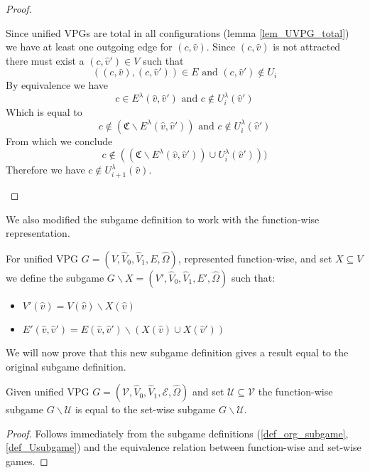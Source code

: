 \begin{lemma}
\begin{proof}
\begin{itemize}
			Since unified VPGs are total in all configurations (lemma \ref{lem_UVPG_total}) we have at least one outgoing edge for $(c,\hat{v})$. Since $(c,\hat{v})$ is not attracted there must exist a $(c,\hat{v}') \in V$ such that 
			\[ ((c,\hat{v}),(c,\hat{v}')) \in E  \text{ and } (c,\hat{v}') \notin U_i \]
			By equivalence we have 
			\[ c \in E^\lambda(\hat{v},\hat{v}')  \text{ and } c \notin U^\lambda_i(\hat{v}') \]
			Which is equal to
			\[ c \notin (\mathfrak{C} \backslash E^\lambda(\hat{v},\hat{v}'))  \text{ and } c \notin U^\lambda_i(\hat{v}') \]
			From which we conclude
			\[ c \notin ((\mathfrak{C} \backslash E^\lambda(\hat{v},\hat{v}')) \cup U^\lambda_i(\hat{v}'))) \]
			Therefore we have $c \notin U^\lambda_{i+1}(\hat{v})$.
		\end{itemize}
	\end{proof}
\end{lemma}

We also modified the subgame definition to work with the function-wise representation.
\begin{definition}
	\label{def_Usubgame}
	For unified VPG $G = (V,\hat{V}_0,\hat{V}_1,E,\hat{\Omega})$, represented function-wise, and set $X \subseteq V$ we define the subgame $G \backslash X = (V',\hat{V}_0,\hat{V}_1,E',\hat{\Omega})$ such that:
	\begin{itemize}
		\item $V'(\hat{v}) = V(\hat{v}) \backslash X(\hat{v})$
		\item $E'(\hat{v},\hat{v}') = E(\hat{v},\hat{v}') \backslash (X(\hat{v}) \cup X(\hat{v}'))$
	\end{itemize}
\end{definition}
We will now prove that this new subgame definition gives a result equal to the original subgame definition.
\begin{lemma}
	\label{lem_subgame_eq}
	Given unified VPG $G = (\mathcal{V},\hat{V}_0,\hat{V}_1, \mathcal{E}, \hat{\Omega})$ and set $\mathcal{U} \subseteq \mathcal{V}$ the function-wise subgame $G \backslash \mathcal{U}$ is equal to the set-wise subgame $G \backslash \mathcal{U}$.
	\begin{proof}
		Follows immediately from the subgame definitions (\ref{def_org_subgame}, \ref{def_Usubgame}) and the equivalence relation between function-wise and set-wise games.
	\end{proof}
\end{lemma}

